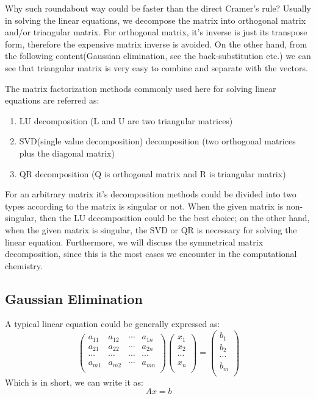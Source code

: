 Why such roundabout way could be faster than the direct Cramer's rule? 
Usually in solving the linear equations, we decompose the matrix into orthogonal 
matrix and/or triangular matrix. For orthogonal matrix, it's inverse is just its 
transpose form, therefore the expensive matrix inverse is avoided. On the other
hand, from the following content(Gaussian elimination, see the back-substitution 
etc.) we can see that triangular matrix is very easy to combine and separate with 
the vectors. 

The matrix factorization methods commonly used here for solving linear equations 
are referred as:
\begin{enumerate}
 \item LU decomposition (L and U are two triangular matrices)
 \item SVD(single value decomposition) decomposition 
       (two orthogonal matrices plus the diagonal matrix)
 \item QR decomposition (Q is orthogonal matrix and R is triangular matrix)
\end{enumerate}

For an arbitrary matrix it's decomposition methods could be divided into two types 
according to the matrix is singular or not. When the given matrix is non-singular, 
then the LU decomposition could be the best choice; on the other hand, when the given 
matrix is singular, the SVD or QR is necessary for solving the linear equation. Furthermore, 
we will discuss the symmetrical matrix decomposition, since this is the most cases we 
encounter in the computational chemistry.


\subsection{Gaussian Elimination}
%
%
A typical linear equation could be generally expressed as:
\begin{equation}
 \label{Solution_Linear_Equations_eq:1}
 \begin{pmatrix}
a_{11}  &  a_{12}  & \cdots  & a_{1n} \\ 
a_{21}  &  a_{22}  & \cdots  & a_{2n} \\ 
\cdots  &  \cdots  & \cdots  & \cdots \\ 
a_{m1}  &  a_{m2}  & \cdots  & a_{mn} \\ 
\end{pmatrix}
\begin{pmatrix}
 x_{1} \\
 x_{2} \\
 \cdots \\
 x_{n} \\
\end{pmatrix}
= 
\begin{pmatrix}
 b_{1} \\
 b_{2} \\
 \cdots \\
 b_{m} \\
\end{pmatrix}
\end{equation}
Which is in short, we can write it as:
\begin{equation}
 \label{Solution_Linear_Equations_eq:2}
 Ax = b
\end{equation}

